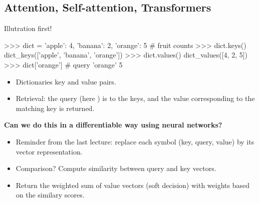 \subsection{Attention, Self-attention, Transformers}
\begin{frame}[fragile]{Illutration first!}
\begin{python}
>>> dict = {'apple': 4, 'banana': 2, 'orange': 5}  # fruit counts
>>> dict.keys()
dict_keys(['apple', 'banana', 'orange'])
>>> dict.values()
dict_values([4, 2, 5])
>>> dict['orange']  # query 'orange'
5
\end{python}
\begin{itemize}
\item Dictionaries  key and value pairs.
\item Retrieval: the query (here ) is  to the keys,
and the value corresponding to the matching key is returned.
\end{itemize}
\pause
\vsp
\textbf{Can we do this in a differentiable way using neural networks?}
\pause
\begin{itemize}
\item Reminder from the last lecture: replace each symbol (key, query, value) by its vector representation.
\pause
\item Comparison? Compute similarity between query and key vectors.
\pause
\item Return the weighted sum of value vectors (soft decision) with weights based on the similary scores.
\end{itemize}
\end{frame}


